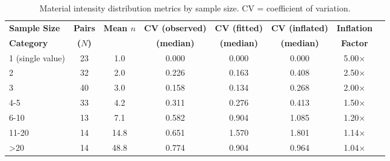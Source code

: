 \begin{table}[htbp]
\centering
\caption{Material intensity distribution metrics by sample size. CV = coefficient of variation.}
\label{tab:intensity_summary}
\small
\begin{tabular}{lccccccc}
\toprule
\textbf{Sample Size} & \textbf{Pairs} & \textbf{Mean $n$} & \textbf{CV (observed)} & \textbf{CV (fitted)} & \textbf{CV (inflated)} & \textbf{Inflation} \\
\textbf{Category} & \textbf{($N$)} & & \textbf{(median)} & \textbf{(median)} & \textbf{(median)} & \textbf{Factor} \\
\midrule
1 (single value) & 23 & 1.0 & 0.000 & 0.000 & 0.000 & 5.00× \\
2 & 32 & 2.0 & 0.226 & 0.163 & 0.408 & 2.50× \\
3 & 40 & 3.0 & 0.158 & 0.134 & 0.268 & 2.00× \\
4-5 & 33 & 4.2 & 0.311 & 0.276 & 0.413 & 1.50× \\
6-10 & 13 & 7.1 & 0.582 & 0.904 & 1.085 & 1.20× \\
11-20 & 14 & 14.8 & 0.651 & 1.570 & 1.801 & 1.14× \\
>20 & 14 & 48.8 & 0.774 & 0.904 & 0.964 & 1.04× \\
\bottomrule
\end{tabular}
\end{table}
